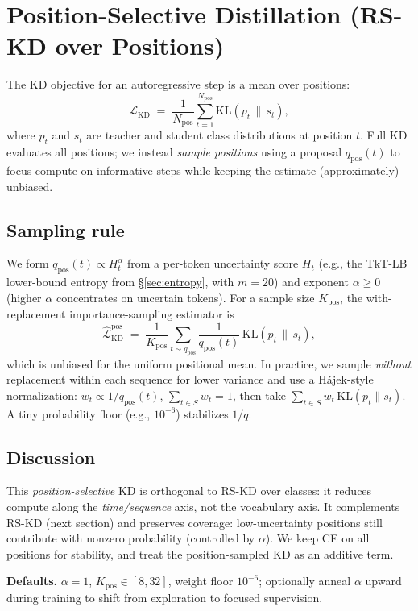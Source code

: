 \documentclass[11pt]{article}
\begin{document}
\section{Position-Selective Distillation (RS-KD over Positions)}
\label{sec:posrs}

The KD objective for an autoregressive step is a mean over positions:
\[
	\mathcal{L}_{\text{KD}} \;=\; \frac{1}{N_{\text{pos}}} \sum_{t=1}^{N_{\text{pos}}}
	\mathrm{KL}\!\left(p_t \,\|\, s_t\right),
\]
where $p_t$ and $s_t$ are teacher and student class distributions at position $t$.
Full KD evaluates all positions; we instead \emph{sample positions} using a proposal
$q_{\text{pos}}(t)$ to focus compute on informative steps while keeping the estimate (approximately) unbiased.

\subsection{Sampling rule}
We form $q_{\text{pos}}(t) \propto H_t^\alpha$ from a per-token uncertainty score $H_t$
(e.g., the TkT-LB lower-bound entropy from \S\ref{sec:entropy}, with $m{=}20$) and exponent $\alpha\!\ge\!0$ (higher $\alpha$ concentrates on uncertain tokens). For a sample size $K_{\text{pos}}$, the with-replacement importance-sampling estimator is
\[
	\widehat{\mathcal{L}}_{\text{KD}}^{\text{pos}} \;=\;
	\frac{1}{K_{\text{pos}}} \sum_{t \sim q_{\text{pos}}}
	\frac{1}{q_{\text{pos}}(t)} \,\mathrm{KL}\!\left(p_t \,\|\, s_t\right),
\]
which is unbiased for the uniform positional mean. In practice, we sample \emph{without} replacement within each sequence for lower variance and use a Hájek-style normalization: $w_t \propto 1/q_{\text{pos}}(t)$, $\sum_{t\in S} w_t=1$, then take $\sum_{t\in S} w_t\,\mathrm{KL}(p_t\|s_t)$.
A tiny probability floor (e.g., $10^{-6}$) stabilizes $1/q$.

\subsection{Discussion}
This \emph{position-selective} KD is orthogonal to RS-KD over classes: it reduces compute along the \emph{time/sequence} axis, not the vocabulary axis. It complements RS-KD (next section) and preserves coverage: low-uncertainty positions still contribute with nonzero probability (controlled by $\alpha$).
We keep CE on all positions for stability, and treat the position-sampled KD as an additive term.

\vspace{0.5em}
\noindent\textbf{Defaults.}
$\alpha{=}1$, $K_{\text{pos}}\!\in\![8,32]$, weight floor $10^{-6}$; optionally anneal $\alpha$ upward during training to shift from exploration to focused supervision.
\end{document}
